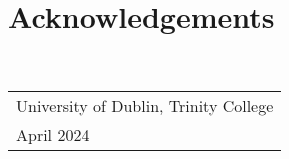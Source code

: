 \chapter*{Acknowledgements}

\begin{spacing}{1.5}
\blindtext
\end{spacing}

{
\par \vspace{20mm}
 \\[10mm]
\raggedright {{\slshape \begin{tabular}{l}University of Dublin, Trinity College \\ April 2024\end{tabular}}}
}

